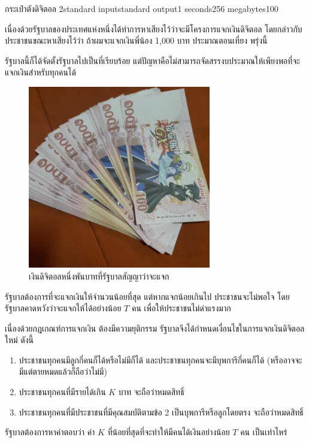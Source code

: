 \documentclass[11pt,a4paper]{article}
\begin{document}
\begin{problem}{กระเป๋าตังดิจิตอล 2}{standard input}{standard output}{1 seconds}{256 megabytes}{100}

เนื่องด้วยรัฐบาลของประเทศแห่งหนึ่งได้ทำการหาเสียงไว้ว่าจะมีโครงการแจกเงินดิจิตอล โดยกล่าวกับประชาชนขณะหาเสียงไว้ว่า ถ้าผมจะแจกเงินพี่น้อง 1,000 บาท ประมาณตอนเที่ยง พรุ่งนี้

รัฐบาลนี้ก็ได้จัดตั้งรัฐบาลไปเป็นที่เรียบร้อย แต่ปัญหาคือไม่สามารถจัดสรรงบประมาณให้เพียงพอที่จะแจกเงินสำหรับทุกคนได้

\begin{figure}[htp]
\centering
\includegraphics[width=8cm]{digitalwallet2/digitalmoney.jpeg}
\caption{เงินดิจิตอลหนึ่งพันบาทที่รัฐบาลสัญญาว่าจะแจก}
\end{figure}

รัฐบาลต้องการที่จะแจกเงินให้จำนวนน้อยที่สุด แต่หากแจกน้อยเกินไป ประชาชนจะไม่พอใจ โดยรัฐบาลคาดหวังว่าจะแจกให้ได้อย่างน้อย $T$ คน เพื่อให้ประชาชนไม่ด่าแรงมาก

เนื่องด้วยกฎเกณฑ์การแจกเงิน ต้องมีความยุติกรรม รัฐบาลจึงได้กำหนดเงื่อนไขในการแจกเงินดิจิตอลใหม่ ดังนี้

\begin{enumerate}
\item ประชาชนทุกคนมีลูกกี่คนก็ได้หรือไม่มีก็ได้ และประชาชนทุกคนจะมีบุพการีกี่คนก็ได้ (หรืออาจจะมีแต่ตายหมดแล้วก็ถือว่าไม่มี)
\item ประชาชนทุกคนที่มีรายได้เกิน $K$ บาท จะถือว่าหมดสิทธิ์
\item ประชาชนทุกคนที่มีประชาชนที่มีคุณสมบัติตามข้อ 2 เป็นบุพการีหรือลูกโดยตรง จะถือว่าหมดสิทธิ์
\end{enumerate}

รัฐบาลต้องการหาคำตอบว่า ค่า $K$ ที่น้อยที่สุดที่จะทำให้มีคนได้เงินอย่างน้อย $T$ คน เป็นเท่าไหร่


\end{problem}
\end{document}
